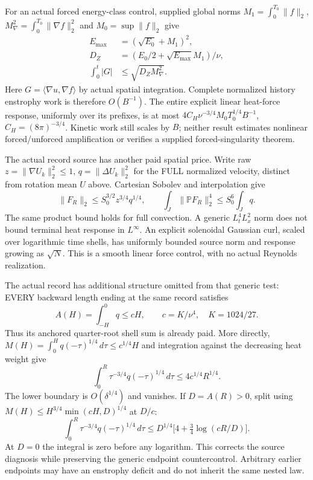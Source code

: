 \documentclass[11pt]{article}
\begin{document}
For an actual forced energy-class control, supplied global norms
$M_1=\int_0^{T_0}\|f\|_2$, $M_{\nabla}^2=\int_0^{T_0}\|\nabla f\|_2^2$
and $M_0=\sup\|f\|_2$ give
\[
 \begin{aligned}
 E_{\max}&=(\sqrt{E_0}+M_1)^2,\\
 D_Z&=(E_0/2+\sqrt{E_{\max}}M_1)/\nu,\\
 \int_0^t|G|&\le\sqrt{D_ZM_{\nabla}^2}.
 \end{aligned}
\]
Here $G=\langle\nabla u,\nabla f\rangle$ by actual spatial integration.
Complete normalized history enstrophy work is therefore $O(B^{-1})$.
The entire explicit linear heat-force response, uniformly over its prefixes,
is at most $4C_H\nu^{-3/4}M_0T_0^{1/4}B^{-1}$,
$C_H=(8\pi)^{-3/4}$. Kinetic work still scales by $B$; neither result
estimates nonlinear forced/unforced amplification or verifies a supplied
forced-singularity theorem.

The actual record source has another paid spatial price. Write raw
$z=\|\nabla U_k\|_2^2\le1$, $q=\|\Delta U_k\|_2^2$ for the FULL normalized
velocity, distinct from rotation mean $U$ above. Cartesian Sobolev and
interpolation give
\[
 \|F_R\|_2\le S_0^{3/2}z^{3/4}q^{1/4},
 \qquad\int_J\|\mathbb P F_R\|_2^4\le S_0^6\int_Jq.
\]
The same product bound holds for full convection. A generic
$L^4_tL^2_x$ norm does not bound terminal heat response in $L^\infty$.
An explicit solenoidal Gaussian curl, scaled over logarithmic time shells,
has uniformly bounded source norm and response growing as $\sqrt N$.
This is a smooth linear force control, with no actual Reynolds realization.

The actual record has additional structure omitted from that generic test:
EVERY backward length ending at the same record satisfies
\[
 A(H)=\int_{-H}^0q\le cH,
 \qquad c=K/\nu^4,\quad K=1024/27.
\]
Thus its anchored quarter-root shell sum is already paid. More directly,
$M(H)=\int_0^Hq(-\tau)^{1/4}\,d\tau\le c^{1/4}H$ and integration
against the decreasing heat weight give
\[
 \int_0^R\tau^{-3/4}q(-\tau)^{1/4}\,d\tau
 \le4c^{1/4}R^{1/4}.
\]
The lower boundary is $O(\delta^{1/4})$ and vanishes. If
$D=A(R)>0$, split using $M(H)\le H^{3/4}\min(cH,D)^{1/4}$ at $D/c$:
\[
 \int_0^R\tau^{-3/4}q(-\tau)^{1/4}\,d\tau
 \le D^{1/4}\bigl[4+\tfrac34\log(cR/D)\bigr].
\]
At $D=0$ the integral is zero before any logarithm. This corrects the
source diagnosis while preserving the generic endpoint countercontrol.
Arbitrary earlier endpoints may have an enstrophy deficit and do not
inherit the same nested law.
\end{document}
